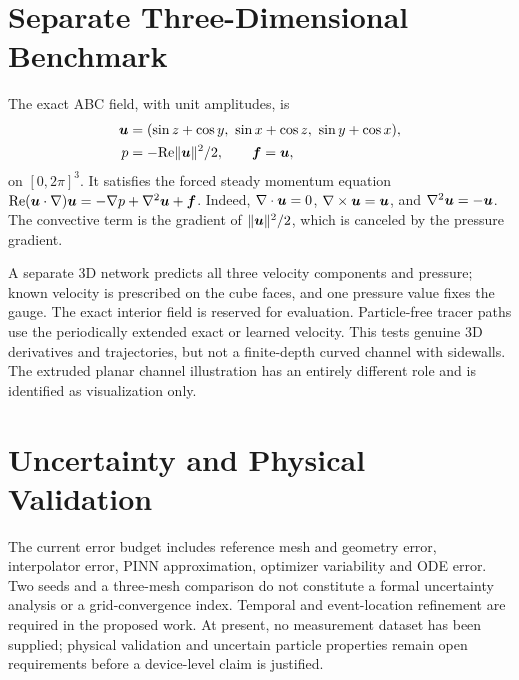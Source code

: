 \section{Separate Three-Dimensional Benchmark}
The exact ABC field, with unit amplitudes, is
\begin{align}
 \boldsymbol{u}&=(\sin z+\cos y,\ \sin x+\cos z,\ \sin y+\cos x),\nonumber\\
 p&=-\mathrm{Re}\lVert\boldsymbol{u}\rVert^2/2,\qquad \boldsymbol{f}=\boldsymbol{u},
 \label{eq:abc}
\end{align}
on $[0,2\pi]^3$. It satisfies the forced steady momentum equation
$\mathrm{Re}(\boldsymbol{u}\cdot\nabla)\boldsymbol{u}=-\nabla p+\nabla^2\boldsymbol{u}+\boldsymbol{f}$.
Indeed, $\nabla\cdot\boldsymbol{u}=0$, $\nabla\times\boldsymbol{u}=\boldsymbol{u}$, and
$\nabla^2\boldsymbol{u}=-\boldsymbol{u}$. The convective term is the gradient of
$\lVert\boldsymbol{u}\rVert^2/2$, which is canceled by the pressure gradient.

A separate 3D network predicts all three velocity components and pressure;
known velocity is prescribed on the cube faces, and one pressure value fixes
the gauge. The exact interior field is reserved for evaluation. Particle-free
tracer paths use the periodically extended exact or learned velocity. This
tests genuine 3D derivatives and trajectories, but not a finite-depth curved
channel with sidewalls. The extruded planar channel illustration has an
entirely different role and is identified as visualization only.

\section{Uncertainty and Physical Validation}
The current error budget includes reference mesh and geometry error,
interpolator error, PINN approximation, optimizer variability and ODE error.
Two seeds and a three-mesh comparison do not constitute a formal uncertainty
analysis or a grid-convergence index. Temporal and event-location refinement
are required in the proposed work. At present, no measurement dataset has
been supplied; physical validation and uncertain particle properties remain
open requirements before a device-level claim is justified.
